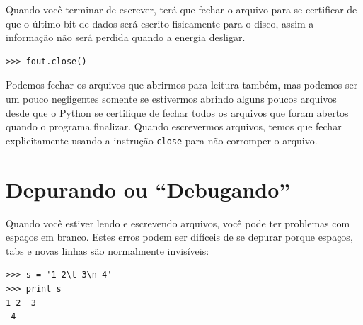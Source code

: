 Quando você terminar de escrever, terá que fechar o arquivo
para se certificar de que o último bit de dados será escrito
fisicamente para o disco, assim a informação não será perdida
quando a energia desligar. 

\beforeverb
\begin{verbatim}
>>> fout.close()
\end{verbatim}
\afterverb

Podemos fechar os arquivos que abrirmos para leitura também,
mas podemos ser um pouco negligentes somente se estivermos
abrindo alguns poucos arquivos desde que o Python se certifique
de fechar todos os arquivos que foram abertos quando o programa
finalizar. Quando escrevermos arquivos, temos que fechar explicitamente
usando a instrução {\tt close} para não corromper o arquivo. 


\section{Depurando ou ``Debugando''}


Quando você estiver lendo e escrevendo arquivos, você pode ter 
problemas com espaços em branco. Estes erros podem ser difíceis 
de se depurar porque espaços, tabs e novas linhas são normalmente
invisíveis:

\beforeverb
\begin{verbatim}
>>> s = '1 2\t 3\n 4'
>>> print s
1 2	 3
 4
\end{verbatim}
\afterverb
 
